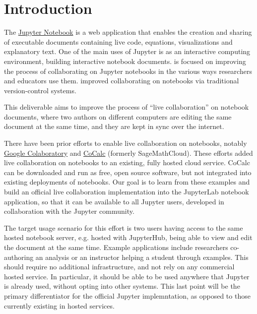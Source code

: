 \documentclass{deliverablereport}
\author{Benjamin Ragan-Kelley, Vidar Tonaas Fauske}
\begin{document}
\maketitle
\tableofcontents


\section{Introduction}

The \href{https://jupyter.org}{Jupyter Notebook} is a web application
that enables the creation and sharing of executable documents
containing live code, equations, visualizations and explanatory text.
One of the main uses of Jupyter is as an interactive computing environment,
building interactive notebook documents.
 is focused on improving the process of collaborating
on Jupyter notebooks in the various ways researchers and educators use them.
 improved collaborating on notebooks via traditional version-control systems.

This deliverable aims to improve the process of ``live collaboration'' on notebook documents,
where two authors on different computers are editing the same document at the same time,
and they are kept in sync over the internet.

There have been prior efforts to enable live collaboration on notebooks,
notably \href{https://colaboratory.google.com}{Google Colaboratory}
and \href{https://cocalc.com}{CoCalc} (formerly SageMathCloud).
These efforts added live collaboration on notebooks to an existing,
fully hosted cloud service.
CoCalc can be downloaded and run as free, open source software,
but not integrated into existing deployments of notebooks.
Our goal is to learn from these examples and build an official live collaboration implementation into the JupyterLab notebook application,
so that it can be available to all Jupyter users,
developed in collaboration with the Jupyter community.


The target usage scenario for this effort is two users having access to the same hosted notebook server, e.g. hosted with JupyterHub,
being able to view and edit the document at the same time.
Example applications include researchers co-authoring an analysis
or an instructor helping a student through examples.
This should require no additional infrastructure,
and not rely on any commercial hosted service.
In particular, it should be able to be used anywhere that Jupyter is already used,
without opting into other systems.
This last point will be the primary differentiator for the official Jupyter implemntation,
as opposed to those currently existing in hosted services.
\end{document}

